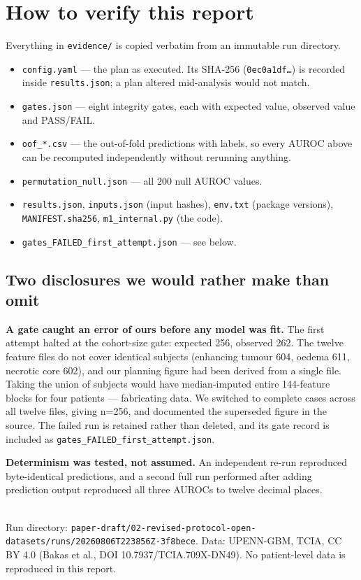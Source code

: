 \documentclass[11pt,a4paper]{article}
\begin{document}
\section{How to verify this report}

Everything in \texttt{evidence/} is copied verbatim from an immutable run directory.

\begin{itemize}[leftmargin=1.4em,nosep]
\item \texttt{config.yaml} --- the plan as executed. Its SHA-256
(\texttt{0ec0a1df\ldots}) is recorded inside \texttt{results.json}; a plan altered
mid-analysis would not match.
\item \texttt{gates.json} --- eight integrity gates, each with expected value, observed
value and PASS/FAIL.
\item \texttt{oof\_*.csv} --- the out-of-fold predictions with labels, so every AUROC above
can be recomputed independently without rerunning anything.
\item \texttt{permutation\_null.json} --- all 200 null AUROC values.
\item \texttt{results.json}, \texttt{inputs.json} (input hashes), \texttt{env.txt}
(package versions), \texttt{MANIFEST.sha256}, \texttt{m1\_internal.py} (the code).
\item \texttt{gates\_FAILED\_first\_attempt.json} --- see below.
\end{itemize}

\subsection*{Two disclosures we would rather make than omit}

\textbf{A gate caught an error of ours before any model was fit.} The first attempt halted
at the cohort-size gate: expected 256, observed 262. The twelve feature files do not cover
identical subjects (enhancing tumour 604, oedema 611, necrotic core 602), and our planning
figure had been derived from a single file. Taking the union of subjects would have
median-imputed entire 144-feature blocks for four patients --- fabricating data. We
switched to complete cases across all twelve files, giving n=256, and documented the
superseded figure in the source. The failed run is retained rather than deleted, and its
gate record is included as \texttt{gates\_FAILED\_first\_attempt.json}.

\textbf{Determinism was tested, not assumed.} An independent re-run reproduced
byte-identical predictions, and a second full run performed after adding prediction output
reproduced all three AUROCs to twelve decimal places.

\vfill
\noindent{\color{qgrey}\rule{\textwidth}{0.4pt}}\\
{\footnotesize\color{qgrey}Run directory:
\texttt{paper-draft/02-revised-protocol-open-datasets/runs/20260806T223856Z-3f8bece}.
Data: UPENN-GBM, TCIA, CC BY 4.0 (Bakas et al., DOI 10.7937/TCIA.709X-DN49). No patient-level
data is reproduced in this report.}
\end{document}
